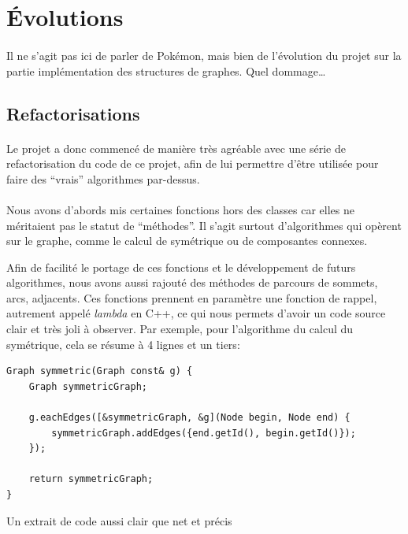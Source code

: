 \documentclass[french]{article}
\begin{document}
\section{Évolutions}

\paragraph{} Il ne s'agit pas ici de parler de Pokémon, mais bien de
l'évolution du projet sur la partie implémentation des structures de graphes.
Quel dommage\ldots

\subsection{Refactorisations}

\paragraph{} Le projet a donc commencé de manière très agréable avec une série
de refactorisation du code de ce projet, afin de lui permettre d'être utilisée
pour faire des ``vrais'' algorithmes par-dessus.

\paragraph{} Nous avons d'abords mis certaines fonctions hors des classes car
elles ne méritaient pas le statut de ``méthodes''. Il s'agit surtout
d'algorithmes qui opèrent sur le graphe, comme le calcul de symétrique ou de
composantes connexes.

Afin de facilité le portage de ces fonctions et le développement de futurs
algorithmes, nous avons aussi rajouté des méthodes de parcours de sommets,
arcs, adjacents. Ces fonctions prennent en paramètre une fonction de rappel,
autrement appelé \emph{lambda} en C++, ce qui nous permets d'avoir un code
source clair et très joli à observer. Par exemple, pour l'algorithme du calcul
du symétrique, cela se résume à 4 lignes et un tiers:

\begin{listing}[H]
\begin{verbatim}
Graph symmetric(Graph const& g) {
	Graph symmetricGraph;

	g.eachEdges([&symmetricGraph, &g](Node begin, Node end) {
		symmetricGraph.addEdges({end.getId(), begin.getId()});
	});

	return symmetricGraph;
}
\end{verbatim}
\caption{Un extrait de code aussi clair que net et précis}
\label{tsp:symmetric}
\end{listing}
\end{document}

